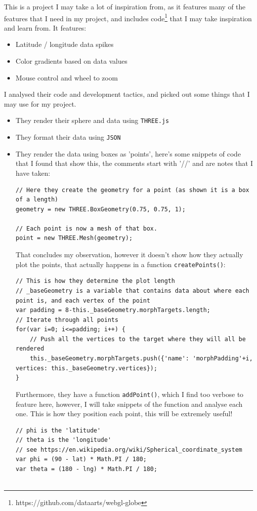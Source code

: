 This is a project I may take a lot of inspiration from, as it features many of the features that I need in my project, and includes code\footnote{https://github.com/dataarts/webgl-globe} that I may take inspiration and learn from.
It features:
\begin{itemize}
\item Latitude / longitude data spikes
\item Color gradients based on data values
\item Mouse control and wheel to zoom
\end{itemize}
I analysed their code and development tactics, and picked out some things that I may use for my project.
\begin{itemize}
\item They render their sphere and data using \verb|THREE.js|
\item They format their data using \verb|JSON|
\item They render the data using boxes as 'points', here's some snippets of code that I found that show this, the comments start with '//' and are notes that I have taken:
\begin{lstlisting}
// Here they create the geometry for a point (as shown it is a box of a length)
geometry = new THREE.BoxGeometry(0.75, 0.75, 1);

// Each point is now a mesh of that box.
point = new THREE.Mesh(geometry);
\end{lstlisting}
That concludes my observation, however it doesn't show how they actually plot the points, that actually happens in a function \verb|createPoints()|:
\begin{lstlisting}
// This is how they determine the plot length
// _baseGeometry is a variable that contains data about where each point is, and each vertex of the point
var padding = 8-this._baseGeometry.morphTargets.length;
// Iterate through all points
for(var i=0; i<=padding; i++) {
	// Push all the vertices to the target where they will all be rendered
	this._baseGeometry.morphTargets.push({'name': 'morphPadding'+i, vertices: this._baseGeometry.vertices});
}
\end{lstlisting}
Furthermore, they have a function \verb|addPoint()|, which I find too verbose to feature here, however, I will take snippets of the function and analyse each one.
This is how they position each point, this will be extremely useful!
\begin{lstlisting}
// phi is the 'latitude'
// theta is the 'longitude'
// see https://en.wikipedia.org/wiki/Spherical_coordinate_system
var phi = (90 - lat) * Math.PI / 180;
var theta = (180 - lng) * Math.PI / 180;


\end{lstlisting}
\end{itemize}
